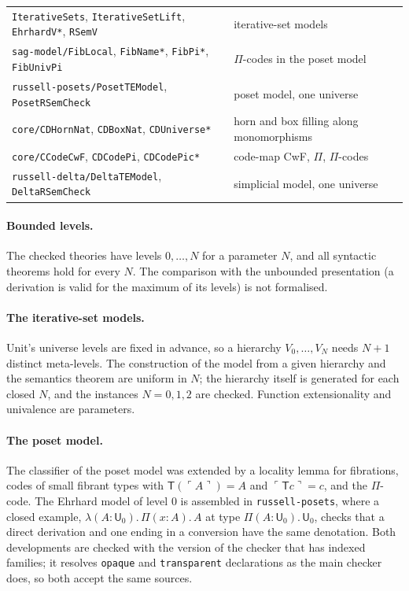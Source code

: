 \documentclass[11pt]{article}
\theoremstyle{definition}
\theoremstyle{remark}
\newcommand{\U}{\mathsf U}
\newcommand{\T}{\mathsf T}
\newcommand{\code}[1]{\ulcorner #1\urcorner}
\newcommand{\seg}[1]{\texttt{#1}}
\begin{document}
\begin{center}
\begin{tabular}{ll}
\seg{IterativeSets}, \seg{IterativeSetLift}, \seg{EhrhardV*}, \seg{RSemV} & iterative-set models\\
\seg{sag-model/FibLocal}, \seg{FibName*}, \seg{FibPi*}, \seg{FibUnivPi} & $\Pi$-codes in the poset model\\
\seg{russell-posets/PosetTEModel}, \seg{PosetRSemCheck} & poset model, one universe\\
\seg{core/CDHornNat}, \seg{CDBoxNat}, \seg{CDUniverse*} & horn and box filling along monomorphisms\\
\seg{core/CCodeCwF}, \seg{CDCodePi}, \seg{CDCodePic*} & code-map CwF, $\Pi$, $\Pi$-codes\\
\seg{russell-delta/DeltaTEModel}, \seg{DeltaRSemCheck} & simplicial model, one universe
\end{tabular}
\end{center}

\paragraph{Bounded levels.} The checked theories have levels $0,\ldots,N$
for a parameter $N$, and all syntactic theorems hold for every $N$. The
comparison with the unbounded presentation (a derivation is valid for the
maximum of its levels) is not formalised.

\paragraph{The iterative-set models.} Unit's universe levels are fixed in
advance, so a hierarchy $V_0,\ldots,V_N$ needs $N+1$ distinct meta-levels.
The construction of the model from a given hierarchy and the semantics
theorem are uniform in $N$; the hierarchy itself is generated for each
closed $N$, and the instances $N=0,1,2$ are checked. Function
extensionality and univalence are parameters.

\paragraph{The poset model.} The classifier of the poset model was
extended by a locality lemma for fibrations, codes of small fibrant types
with $\T(\code{A})=A$ and $\code{\T c}=c$, and the $\Pi$-code. The Ehrhard
model of level $0$ is assembled in \seg{russell-posets}, where a closed
example, $\lambda(A:\U_0).\,\Pi(x:A).\,A$ at type $\Pi(A:\U_0).\,\U_0$,
checks that a direct derivation and one ending in a conversion have the
same denotation. Both developments are checked with the version of the
checker that has indexed families; it resolves \texttt{opaque} and
\texttt{transparent} declarations as the main checker does, so both accept
the same sources.
\end{document}
